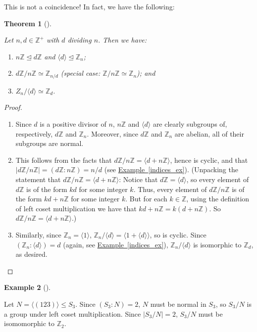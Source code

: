 \documentclass[10pt,]{book}
\theoremstyle{plain}
\newtheorem{theorem}{Theorem}[section]
\theoremstyle{definition}
\theoremstyle{definition}
\theoremstyle{definition}
\newtheorem{example}[theorem]{Example}
\theoremstyle{definition}
\numberwithin{equation}{section}
\def\Z{\mathbb{Z}}
\begin{document}
    This is not a coincidence! In fact, we have the following:
\begin{theorem}[{}]\label{theorem-52}

        Let \(n,d \in \Z^+\) with \(d\) dividing \(n\). Then we have:
        \leavevmode%
\begin{enumerate}
\item\hypertarget{li-494}{}
              \(n\Z\unlhd d\Z\) and \(\langle d\rangle \unlhd \Z_n\);
\item\hypertarget{li-495}{}
              \(d\Z/n\Z\simeq \Z_{n/d}\) (special case: \(\Z/n\Z \simeq \Z_n\));
              and
\item\hypertarget{li-496}{}
              \(Z_n/\langle d\rangle  \simeq \Z_d\).
\end{enumerate}

\end{theorem}
\begin{proof}\hypertarget{proof-47}{}
\leavevmode%
\begin{enumerate}
\item\hypertarget{li-497}{}
          Since \(d\) is a positive divisor of \(n\), \(n\Z\) and
          \(\langle d\rangle\) are clearly subgroups of, respectively, \(d\Z\) and \(\Z_n\).
          Moreover, since \(d\Z\) and \(\Z_n\) are abelian, all of their subgroups
          are normal.
\item\hypertarget{li-498}{}
          This follows from the facts that \(d\Z/n\Z=\langle d+n\Z\rangle\), hence
          is cyclic, and that \(|d\Z/n\Z|=(d\Z:n\Z)=n/d\) (see \hyperref[indices_ex]{Example~\ref{indices_ex}}). (Unpacking the statement that
          \(d\Z/n\Z=\langle d+n\Z\rangle\): Notice that \(d\Z=\langle d\rangle\), so every element of
          \(d\Z\) is of the form \(kd\) for some integer \(k\). Thus, every element
          of \(d\Z/n\Z\) is of the form \(kd+n\Z\) for some integer \(k\). But for
          each \(k\in \Z\), using the definition of left coset multiplication we
          have that \(kd+n\Z=k(d+n\Z)\). So \(d\Z/n\Z=\langle d+n\Z\rangle\).)
\item\hypertarget{li-499}{}
          Similarly, since \(\Z_n=\langle 1\rangle\), \(\Z_n/\langle d\rangle =\langle 1+\langle d\rangle \rangle\), so
          is cyclic. Since \((\Z_n:\langle d\rangle )=d\) (again, see \hyperref[indices_ex]{Example~\ref{indices_ex}}), \(\Z_n/\langle d\rangle\) is isomorphic to \(\Z_d\), as desired. \qedhere
\end{enumerate}
\end{proof}
\begin{example}[]\label{example-84}

        Let \(N=\langle (123)\rangle  \leq S_3\). Since \((S_3:N)=2\),
        \(N\) must be normal in \(S_3\), so \(S_3/N\) is a group under left coset
        multiplication. Since \(|S_3/N|=2\), \(S_3/N\) must be isomomorphic to
        \(\Z_2\).
\end{example}
\par
\end{document}
